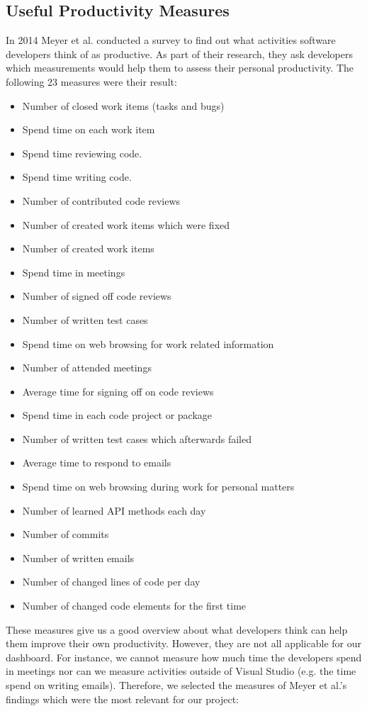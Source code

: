 \documentclass{seal_article}
\begin{document}
\subsection{Useful Productivity Measures}
	In 2014 Meyer et al. \cite{Meyer:2014:SDP:2635868.2635892} conducted a survey to find out what activities software developers think of as productive. As part of their research, they ask developers which measurements would help them to assess their personal productivity. The following 23 measures were their result: 
	\begin{itemize}
		\item Number of closed work items (tasks and bugs)
		\item Spend time on each work item
		\item Spend time reviewing code.
		\item Spend time writing code.
		\item Number of contributed code reviews
		\item Number of created work items which were fixed 
		\item Number of created work items
		\item Spend time in meetings
		\item Number of signed off code reviews
		\item Number of written test cases
		\item Spend time on web browsing for work related information
		\item Number of attended meetings
		\item Average time for signing off on code reviews
		\item Spend time in each code project or package
		\item Number of written test cases which afterwards failed
		\item Average time to respond to emails
		\item Spend time on web browsing during work for personal matters
		\item Number of learned API methods each day
		\item Number of commits
		\item Number of written emails
		\item Number of changed lines of code per day
		\item Number of changed code elements for the first time
	\end{itemize} 
	These measures give us a good overview about what developers think can help them improve their own productivity. However, they are not all applicable for our dashboard. For instance, we cannot measure how much time the developers spend in meetings nor can we measure activities outside of Visual Studio (e.g. the time spend on writing emails). Therefore, we selected the measures of Meyer et al.'s findings \cite{Meyer:2014:SDP:2635868.2635892} which were the most relevant for our project:
\end{document}
